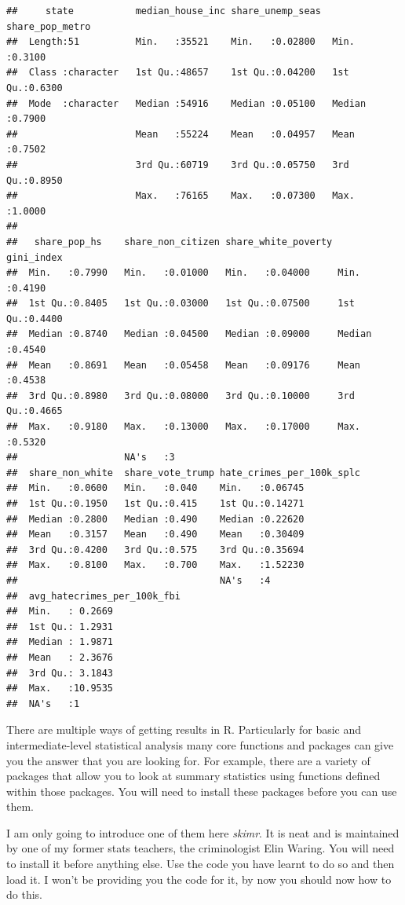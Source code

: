 \documentclass[]{book}
\theoremstyle{definition}
\theoremstyle{definition}
\theoremstyle{definition}
\theoremstyle{remark}
\begin{document}
\begin{verbatim}
##     state           median_house_inc share_unemp_seas  share_pop_metro 
##  Length:51          Min.   :35521    Min.   :0.02800   Min.   :0.3100  
##  Class :character   1st Qu.:48657    1st Qu.:0.04200   1st Qu.:0.6300  
##  Mode  :character   Median :54916    Median :0.05100   Median :0.7900  
##                     Mean   :55224    Mean   :0.04957   Mean   :0.7502  
##                     3rd Qu.:60719    3rd Qu.:0.05750   3rd Qu.:0.8950  
##                     Max.   :76165    Max.   :0.07300   Max.   :1.0000  
##                                                                        
##   share_pop_hs    share_non_citizen share_white_poverty   gini_index    
##  Min.   :0.7990   Min.   :0.01000   Min.   :0.04000     Min.   :0.4190  
##  1st Qu.:0.8405   1st Qu.:0.03000   1st Qu.:0.07500     1st Qu.:0.4400  
##  Median :0.8740   Median :0.04500   Median :0.09000     Median :0.4540  
##  Mean   :0.8691   Mean   :0.05458   Mean   :0.09176     Mean   :0.4538  
##  3rd Qu.:0.8980   3rd Qu.:0.08000   3rd Qu.:0.10000     3rd Qu.:0.4665  
##  Max.   :0.9180   Max.   :0.13000   Max.   :0.17000     Max.   :0.5320  
##                   NA's   :3                                             
##  share_non_white  share_vote_trump hate_crimes_per_100k_splc
##  Min.   :0.0600   Min.   :0.040    Min.   :0.06745          
##  1st Qu.:0.1950   1st Qu.:0.415    1st Qu.:0.14271          
##  Median :0.2800   Median :0.490    Median :0.22620          
##  Mean   :0.3157   Mean   :0.490    Mean   :0.30409          
##  3rd Qu.:0.4200   3rd Qu.:0.575    3rd Qu.:0.35694          
##  Max.   :0.8100   Max.   :0.700    Max.   :1.52230          
##                                    NA's   :4                
##  avg_hatecrimes_per_100k_fbi
##  Min.   : 0.2669            
##  1st Qu.: 1.2931            
##  Median : 1.9871            
##  Mean   : 2.3676            
##  3rd Qu.: 3.1843            
##  Max.   :10.9535            
##  NA's   :1
\end{verbatim}

There are multiple ways of getting results in R. Particularly for basic
and intermediate-level statistical analysis many core functions and
packages can give you the answer that you are looking for. For example,
there are a variety of packages that allow you to look at summary
statistics using functions defined within those packages. You will need
to install these packages before you can use them.

I am only going to introduce one of them here \emph{skimr}. It is neat
and is maintained by one of my former stats teachers, the criminologist
Elin Waring. You will need to install it before anything else. Use the
code you have learnt to do so and then load it. I won't be providing you
the code for it, by now you should now how to do this.
\end{document}

